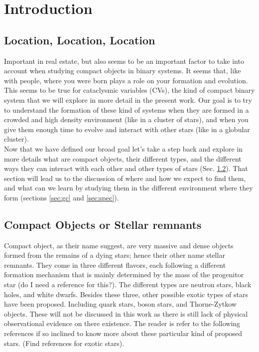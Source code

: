 \chapter{Introduction}
\thispagestyle{fancy}

\section{Location, Location, Location}

Important in real estate, but also seems to be an important factor to take into account when studying compact objects in binary systems. It seems that, like with people, where you were born plays a role on your formation and evolution. This seems to be true for cataclysmic variables (CVs), the kind of compact binary system that we will explore in more detail in the present work. Our goal is to try to understand the formation of these kind of systems when they are formed in a crowded and high density environment (like in a cluster of stars), and when you give them enough time to evolve and interact with other stars (like in a globular cluster). \\ 

Now that we have defined our broad goal let's take a step back and explore in more details what are compact objects, their different types, and the different ways they can interact with each other and other types of stars (Sec. \ref{sec:co}). That section will lead us to the discussion of where and how we expect to find them, and what can we learn by studying them in the different environment where they form (sections \ref{sec:gc} and \ref{sec:spec}).

\section{Compact Objects or Stellar remnants}\label{sec:co}

Compact object, as their name suggest, are very massive and dense objects formed from the remains of a dying stars; hence their other name stellar remnants. They come in three different flavors, each following a different formation mechanism that is mainly determined by the mass of the progenitor star (do I need a reference for this?). The different types are neutron stars, black holes, and white dwarfs. Besides these three, other possible exotic types of stars have been proposed. Including quark stars, boson stars, and Thorne-Zytkow objects. These will not be discussed in this work as there is still lack of physical observational evidence on there existence. The reader is refer to the following references if so inclined to know more about these particular kind of proposed stars. (Find references for exotic stars). \\

